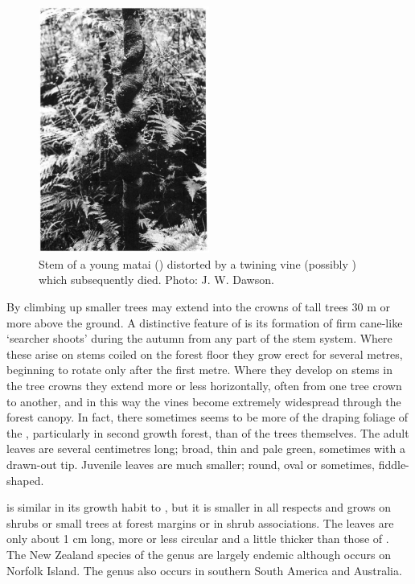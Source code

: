 \begin{figure}
	\includegraphics[width=0.5\textwidth]{graphics/figure35matai.jpg}
	\centering
	\caption[Stem of a young matai]{Stem of a young matai () distorted by a twining vine (possibly ) which subsequently died.
	Photo: J. W. Dawson.}%
	\label{fig:35matai}
\end{figure}

By climbing up smaller trees  may extend into the crowns of tall trees 30 m or more above the ground.
A distinctive feature of  is its formation of firm cane-like `searcher shoots' during the autumn from any part of the stem system.
Where these arise on stems coiled on the forest floor they grow erect for several metres, beginning to rotate only after the first metre.
Where they develop on stems in the tree crowns they extend more or less horizontally, often from one tree crown to another, and in this way the vines become extremely widespread through the forest canopy.
In fact, there sometimes seems to be more of the draping foliage of the , particularly in second growth forest, than of the trees themselves.
The adult leaves are several centimetres long; broad, thin and pale green, sometimes with a drawn-out tip.
Juvenile leaves are much smaller; round, oval or sometimes, fiddle-shaped.

 is similar in its growth habit to , but it is smaller in all respects and grows on shrubs or small trees at forest margins or in shrub associations.
The leaves are only about 1 cm long, more or less circular and a little thicker than those of .
The New Zealand species of the genus are largely endemic although  occurs on Norfolk Island.
The genus also occurs in southern South America and Australia.


